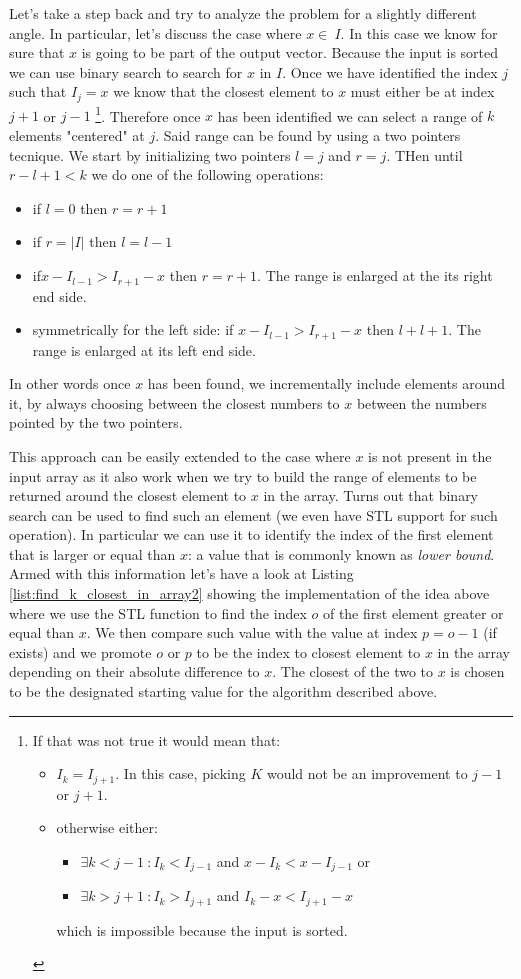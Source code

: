 Let's take a step back and try to analyze the problem for a slightly different angle. In particular,
let's discuss the case where $x \in \: I$. In this case we know for sure that $x$ is going to be
part of the output vector. Because the input is sorted we can use binary search to search for $x$ in
$I$. Once we have identified the index $j$ such that $I_j = x$ we know that the closest element to
$x$ must either be at index $j+1$ or $j-1$ \footnote{If that was not true it would mean that:
\begin{itemize}
	\item $I_k = I_{j+1}$. In this case, picking $K$  would not be an improvement to $j-1$ or $j+1$.
	\item otherwise either:
	\begin{itemize}
		\item $\exists k < j-1 \: : I_k < I_{j-1}$ and  $x-I_k < x-I_{j-1}$ or
		\item $\exists k > j+1 \: : I_k > I_{j+1}$ and  $I_k-x < I_{j+1}-x$ \end{itemize} which is
	impossible because the input is sorted. \end{itemize}}. Therefore once $x$ has been identified
	we can select a range of $k$ elements "centered" at $j$. Said range can be found by using a two
	pointers tecnique. We start by initializing two pointers $l = j$ and $r = j$. THen until $r-l+1
	< k$ we do one of the following operations:
\begin{itemize}
	\item if $l = 0$ then $r = r+1$
	\item if $r = |I|$ then $l = l-1$
	\item if$ x-I_{l-1} > I_{r+1}-x$ then $r = r+1$. The range is enlarged at the its right end
	side.
	\item symmetrically for the left side: if $x-I_{l-1} > I_{r+1}-x$ then $ l + l+1$. The range is
	enlarged at its left end side.
\end{itemize}
In other words once $x$ has been found, we incrementally include elements around it, by always
choosing between the closest numbers to $x$ between the numbers pointed by the two pointers.

This approach can be easily extended to the case where $x$ is not present in the input array as it
also work when we try to build the range of elements to be returned around the closest element to
$x$ in the array. 
Turns out that binary search can be used to find such an element (we even have STL
support for such operation). 
In particular we can use it to identify the index of the first element that is larger or equal than $x$:
a value that is commonly known as \textit{lower bound}.
Armed with this information let's have a look at Listing \ref{list:find_k_closest_in_array2} showing
the implementation of the idea above where we use the STL  function to find
the index $o$ of the first element greater or equal than $x$.
We then compare such value with the value at index $p = o-1$ (if exists)
and we promote $o$ or $p$ to be the index to closest element to $x$ in the array depending on their
absolute difference to $x$.
The closest of the two to $x$ is chosen to be the designated starting value for the algorithm described above.

